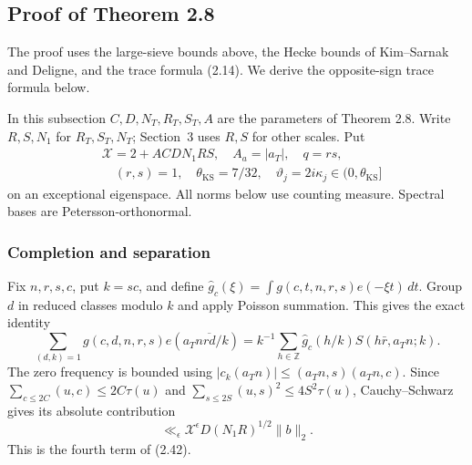 \subsection{Proof of Theorem 2.8}\label{p1:sec:theorem-2-8-proof}

The proof uses the large-sieve bounds above, the Hecke bounds of Kim--Sarnak and Deligne, and the trace formula (2.14). We derive the opposite-sign trace formula below.

In this subsection $C,D,N_T,R_T,S_T,A$ are the parameters of Theorem 2.8. Write $R,S,N_1$ for $R_T,S_T,N_T$; Section~3 uses $R,S$ for other scales. Put
\[
\begin{aligned}
&\mathcal X=2+ACDN_1RS,\quad A_a=|a_T|,\quad q=rs,\\
&\quad(r,s)=1,
\quad\theta_{\mathrm{KS}}=7/32,\quad\vartheta_j=2i\kappa_j\in(0,\theta_{\mathrm{KS}}]
\end{aligned}
\tag{2.7.T1}\label{p1:eq:2.7.T1}
\]
on an exceptional eigenspace. All norms below use counting measure. Spectral bases are Petersson-orthonormal.

\subsubsection{Completion and separation}

Fix $n,r,s,c$, put $k=sc$, and define
$\widehat g_c(\xi)=\int g(c,t,n,r,s)e(-\xi t)\,dt$.
Group $d$ in reduced classes modulo $k$ and apply Poisson summation.
This gives the exact identity
\[
\sum_{(d,k)=1}g(c,d,n,r,s)e(a_Tn\overline{rd}/k)
 =k^{-1}\sum_{h\in\mathbb Z}\widehat g_c(h/k)
                       S(h\bar r,a_Tn;k).
\tag{2.7.T2}\label{p1:eq:2.7.T2}
\]
The zero frequency is bounded using
$|c_k(a_Tn)|\le(a_Tn,s)(a_Tn,c)$. Since
$\sum_{c\le2C}(u,c)\le2C\tau(u)$ and
$\sum_{s\le2S}(u,s)^2\le4S^2\tau(u)$, Cauchy--Schwarz gives its
absolute contribution
\[
\ll_\epsilon\mathcal X^\epsilon D(N_1R)^{1/2}\|b\|_2.
\tag{2.7.T3}\label{p1:eq:2.7.T3}
\]
This is the fourth term of (2.42).

